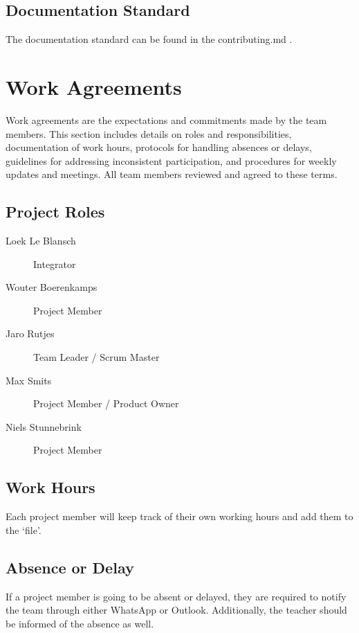 \documentclass{projdoc}
\begin{document}
\subsection{Documentation Standard}

The documentation standard can be found in the contributing.md
\autocite{crepe:docs-standard}.

\section{Work Agreements}

Work agreements are the expectations and commitments made by the team members. This
section includes details on roles and responsibilities, documentation of work hours,
protocols for handling absences or delays, guidelines for addressing inconsistent
participation, and procedures for weekly updates and meetings. All team members
reviewed and agreed to these terms.

\subsection{Project Roles}

\begin{description}
	\item[Loek Le Blansch] Integrator
	\item[Wouter Boerenkamps] Project Member
	\item[Jaro Rutjes] Team Leader / Scrum Master
	\item[Max Smits] Project Member / Product Owner
	\item[Niels Stunnebrink] Project Member
\end{description}

\subsection{Work Hours}

Each project member will keep track of their own working hours and add them to the
`file'.

\subsection{Absence or Delay}

If a project member is going to be absent or delayed, they are required to
notify the team through either WhatsApp or Outlook. Additionally, the teacher
should be informed of the absence as well.
\end{document}
